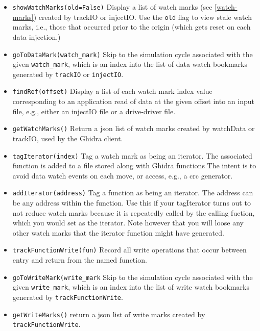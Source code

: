 \documentclass[titlepage]{article}
\begin{document}
\begin{itemize}
\item {\tt showWatchMarks(old=False)} Display a list of watch marks (see \ref{watch-marks}) created by trackIO or injectIO.  Use the {\tt old} flag to view stale watch marks, i.e., 
those that occurred prior to the origin (which gets reset on each data injection.)

\item {\tt goToDataMark(watch\_mark)}  Skip to the simulation cycle associated with the given {\tt watch\_mark}, which is an index into the list of data watch bookmarks generated by {\tt trackIO} or {\tt injectIO}.

\item {\tt findRef(offset)} Display a list of each watch mark index value corresponding to an application read of data at the given offset into
an input file, e.g., either an injectIO file or a drive-driver file.

\item {\tt getWatchMarks()} Return a json list of watch marks created by watchData or trackIO, used by the Ghidra client.

\item {\tt tagIterator(index)} Tag a watch mark as being an iterator.  The associated function is added to a file stored along with Ghidra functions
The intent is to avoid data watch events on each move, or access, e.g., a crc generator.

\item {\tt addIterator(address)} Tag a function as being an iterator. The address can be any address within the function.  Use this if your tagIterator turns out
to not reduce watch marks because it is repeatedly called by the calling fuction, which you would set as the iterator.  Note however that you will loose any other watch
marks that the iterator function might have generated. 

\item {\tt trackFunctionWrite(fun)} Record all write operations that occur between entry and return from the named function.

\item {\tt goToWriteMark(write\_mark} Skip to the simulation cycle associated with the given {\tt write\_mark}, which is an index into the list of 
write watch bookmarks generated by {\tt trackFunctionWrite}.

\item {\tt getWriteMarks()} return a json list of write marks created by {\tt trackFunctionWrite}.


\end{itemize}
\end{document}
